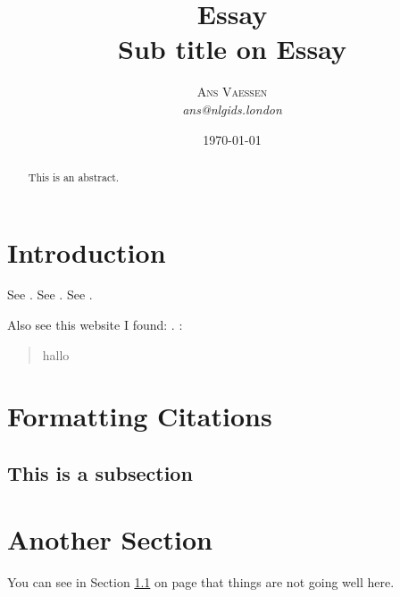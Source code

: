 \documentclass[a4paper, 11pt]{article}
\title{\textbf{Essay}\\Sub title on Essay}
\author{\textsc{Ans Vaessen}
\\{\textit{ans@nlgids.london}}}
\date{\today}
\begin{document}
 
\maketitle 

\begin{abstract}
This is an abstract.
\end{abstract}

\vspace{30pt} %

\section*{Introduction}

See \cite{Christensen97}.
See \citep{Christensen97}.
See \citep[p. 145]{Christensen97}.

Also see this website I found: \cite{TripAdvisor}.
:
\begin{quote}
hallo
\end{quote}

\section{Formatting Citations}

\subsection{This is a subsection}
\label{sec:this-is-a-section}

\section{Another Section}
You can see in Section \ref{sec:this-is-a-section} on page \pageref{sec:this-is-a-section} that things are not going well here.

{}
\end{document}
